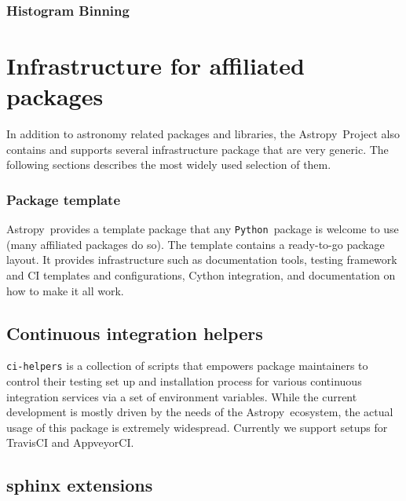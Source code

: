 \documentclass[modern]{aastex61}
\newcommand{\package}[1]{\texttt{#1}}
\newcommand{\python}{\package{Python}}
\newcommand{\astropy}{Astropy}
\begin{document}
\subsubsection{Histogram Binning}

\section{Infrastructure for affiliated packages}
\label{sec:infrastructure}
%
\par In addition to astronomy related packages and libraries, the \astropy\
Project also contains and supports several infrastructure package that are
very generic. The following sections describes the most widely used
selection of them.
%
\subsubsection{Package template}
\par \astropy\ provides a template package that any \python\ package is welcome to
use (many affiliated packages do so). The template contains a ready-to-go
package layout. It provides infrastructure such as documentation tools,
testing framework and CI templates and configurations, Cython integration,
and documentation on how to make it all work.
%
\subsection{Continuous integration helpers}
\texttt{ci-helpers} is a collection of scripts that empowers package
maintainers to control their testing set up and installation process for
various continuous integration services via a set of environment
variables. While the current development is mostly driven by the needs of
the \astropy\ ecosystem, the actual usage of this package is extremely
widespread. Currently we support setups for TravisCI and AppveyorCI.
%
\subsection{sphinx extensions}


\end{document}
